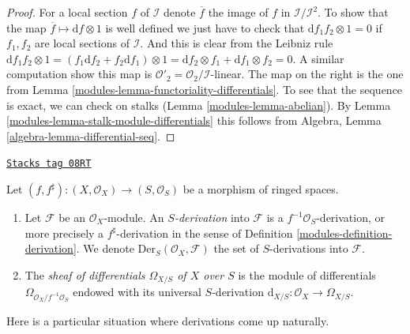 \begin{proof}

For a local section $f$ of $\mathcal{I}$ denote $\overline{f}$ the image of
$f$ in $\mathcal{I}/\mathcal{I}^2$. To show that the map
$\overline{f} \mapsto \text{d}f \otimes 1$ is well defined we just have to
check that $\text{d} f_1f_2 \otimes 1 = 0$ if $f_1, f_2$ are local sections
of $\mathcal{I}$. And this is clear from the Leibniz rule
$\text{d} f_1f_2 \otimes 1 =
(f_1 \text{d}f_2 + f_2 \text{d} f_1 )\otimes 1 =
\text{d}f_2 \otimes f_1 + \text{d}f_1 \otimes f_2 = 0$.
A similar computation show this map is
$\mathcal{O}'_2 = \mathcal{O}_2/\mathcal{I}$-linear. The map on the right
is the one from Lemma \ref{modules-lemma-functoriality-differentials}. To see
that the sequence is exact, we can check on stalks
(Lemma \ref{modules-lemma-abelian}). By
Lemma \ref{modules-lemma-stalk-module-differentials}
this follows from
Algebra, Lemma \ref{algebra-lemma-differential-seq}.
\end{proof}

\begin{definition}[Differentials]
\label{modules-definition-differentials}
\href{https://stacks.math.columbia.edu/tag/08RT}{\texttt{Stacks tag 08RT}}

Let $(f, f^\sharp) : (X, \mathcal{O}_X) \to (S, \mathcal{O}_S)$
be a morphism of ringed spaces.
\begin{enumerate}
\item Let $\mathcal{F}$ be an $\mathcal{O}_X$-module. An {\it $S$-derivation}
into $\mathcal{F}$ is a $f^{-1}\mathcal{O}_S$-derivation, or more
precisely a $f^\sharp$-derivation in the sense of
Definition \ref{modules-definition-derivation}.
We denote $\text{Der}_S(\mathcal{O}_X, \mathcal{F})$
the set of $S$-derivations into $\mathcal{F}$.
\item The {\it sheaf of differentials $\Omega_{X/S}$ of $X$ over $S$}
is the module of differentials $\Omega_{\mathcal{O}_X/f^{-1}\mathcal{O}_S}$
endowed with its universal
$S$-derivation $\text{d}_{X/S} : \mathcal{O}_X \to \Omega_{X/S}$.
\end{enumerate}
\end{definition}

Here is a particular situation where derivations come up
naturally.

